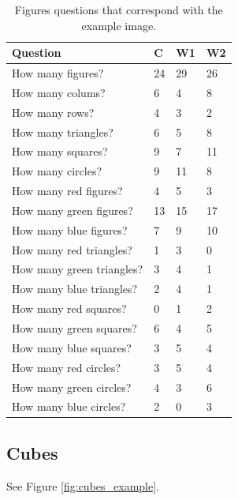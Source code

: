 \documentclass[11pt]{article}
\begin{document}
\begin{table}
\centering
\begin{tabular}{llll}
\toprule
Question                  & C       & W1     & W2     \\ \midrule
How many figures?         & 24      & 29     & 26     \\
How many colums?          & 6       & 4      & 8      \\
How many rows?            & 4       & 3      & 2      \\ \midrule
How many triangles?       & 6       & 5      & 8      \\
How many squares?         & 9       & 7      & 11     \\
How many circles?         & 9       & 11     & 8      \\ \midrule
How many red figures?     & 4       & 5      & 3      \\
How many green figures?   & 13      & 15     & 17     \\
How many blue figures?    & 7       & 9      & 10     \\ \midrule
How many red triangles?   & 1       & 3      & 0      \\ 
How many green triangles? & 3       & 4      & 1      \\
How many blue triangles?  & 2       & 4      & 1      \\
How many red squares?     & 0       & 1      & 2      \\
How many green squares?   & 6       & 4      & 5      \\
How many blue squares?    & 3       & 5      & 4      \\
How many red circles?     & 3       & 5      & 4      \\
How many green circles?   & 4       & 3      & 6      \\
How many blue circles?    & 2       & 0      & 3      \\ \bottomrule
\end{tabular}
\caption{Figures questions that correspond with the example image.}
\label{tab:figures_example}
\end{table}

\subsection{Cubes}

See Figure \ref{fig:cubes_example}.
\end{document}
